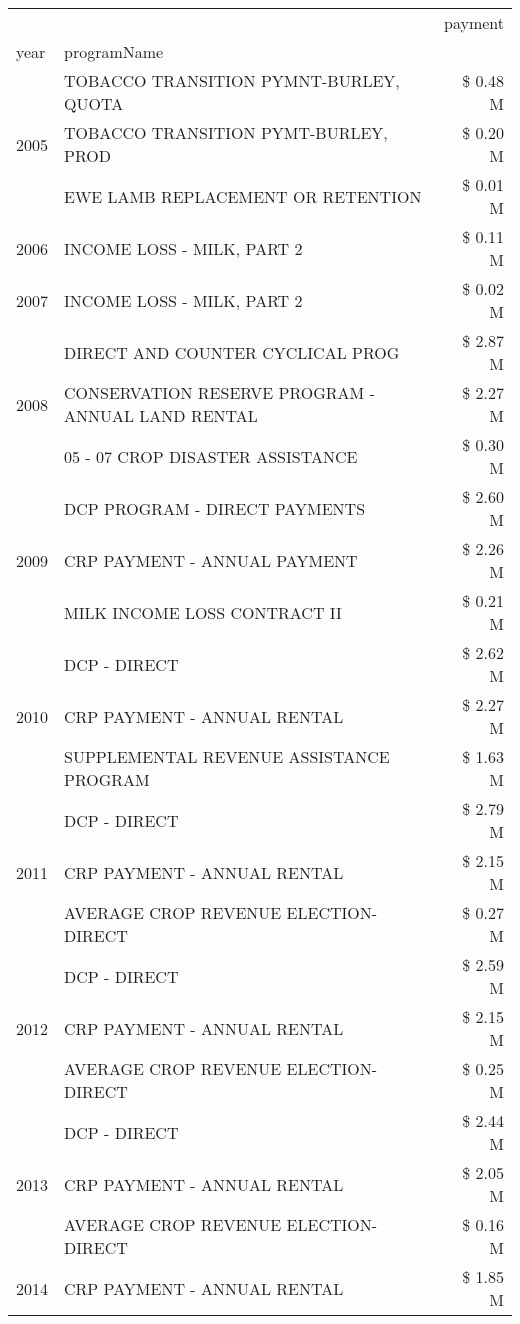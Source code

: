 \begin{tabular}{llr}
\toprule
 &  & payment \\
year & programName &  \\
\midrule
\multirow[t]{3}{*}{2005} & TOBACCO TRANSITION PYMNT-BURLEY, QUOTA & \$ 0.48 M \\
 & TOBACCO TRANSITION PYMT-BURLEY, PROD & \$ 0.20 M \\
 & EWE LAMB REPLACEMENT OR RETENTION & \$ 0.01 M \\
\cline{1-3}
2006 & INCOME LOSS - MILK, PART 2 & \$ 0.11 M \\
\cline{1-3}
2007 & INCOME LOSS - MILK, PART 2 & \$ 0.02 M \\
\cline{1-3}
\multirow[t]{3}{*}{2008} & DIRECT AND COUNTER CYCLICAL PROG & \$ 2.87 M \\
 & CONSERVATION RESERVE PROGRAM - ANNUAL LAND RENTAL & \$ 2.27 M \\
 & 05 - 07 CROP DISASTER ASSISTANCE & \$ 0.30 M \\
\cline{1-3}
\multirow[t]{3}{*}{2009} & DCP PROGRAM - DIRECT PAYMENTS & \$ 2.60 M \\
 & CRP PAYMENT - ANNUAL PAYMENT & \$ 2.26 M \\
 & MILK INCOME LOSS CONTRACT II & \$ 0.21 M \\
\cline{1-3}
\multirow[t]{3}{*}{2010} & DCP - DIRECT & \$ 2.62 M \\
 & CRP PAYMENT - ANNUAL RENTAL & \$ 2.27 M \\
 & SUPPLEMENTAL REVENUE ASSISTANCE PROGRAM & \$ 1.63 M \\
\cline{1-3}
\multirow[t]{3}{*}{2011} & DCP - DIRECT & \$ 2.79 M \\
 & CRP PAYMENT - ANNUAL RENTAL & \$ 2.15 M \\
 & AVERAGE CROP REVENUE ELECTION-DIRECT & \$ 0.27 M \\
\cline{1-3}
\multirow[t]{3}{*}{2012} & DCP - DIRECT & \$ 2.59 M \\
 & CRP PAYMENT - ANNUAL RENTAL & \$ 2.15 M \\
 & AVERAGE CROP REVENUE ELECTION-DIRECT & \$ 0.25 M \\
\cline{1-3}
\multirow[t]{3}{*}{2013} & DCP - DIRECT & \$ 2.44 M \\
 & CRP PAYMENT - ANNUAL RENTAL & \$ 2.05 M \\
 & AVERAGE CROP REVENUE ELECTION-DIRECT & \$ 0.16 M \\
\cline{1-3}
\multirow[t]{3}{*}{2014} & CRP PAYMENT - ANNUAL RENTAL & \$ 1.85 M \\

\end{tabular}
